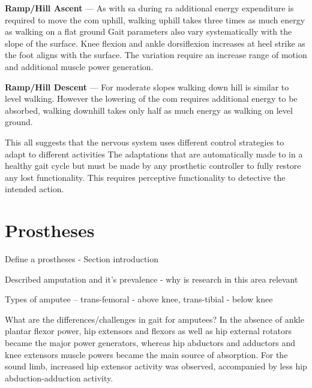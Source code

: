 \textbf{Ramp/Hill Ascent} --- As with \acrshort{sa} during \acrshort{ra} additional energy expenditure is required to move the \acrshort{com} uphill\cite{Franz2012a}, walking uphill takes three times as much energy as walking on a flat ground\cite{Matsumoto2017} Gait parameters also vary systematically with the slope of the surface\cite{Kimel-Naor2017}. Knee flexion and ankle dorsiflexion increases at heel strike as the foot aligns with the surface. The variation require an increase range of motion and additional muscle power generation.\cite{McIntosh2006}

\textbf{Ramp/Hill Descent} --- For moderate slopes walking down hill is similar to level walking. However the lowering of the \acrshort{com} requires additional energy to be absorbed\cite{Franz2012a}, walking downhill takes only half as much energy as walking on level ground\cite{Matsumoto2017}.

This all suggests that the nervous system uses different control strategies to adapt to different activities\cite{Lay2007} The adaptations that are automatically made to in a healthy gait cycle but must be made by any prosthetic controller to fully restore any lost functionality. This requires perceptive functionality to detective the intended action.



\section{Prostheses}
Define a prostheses - Section introduction

Described amputation and it's prevalence - why is research in this area relevant 

Types of amputee -- trans-femoral - above knee, trans-tibial - below knee

What are the differences/challenges in gait for amputees? 
In the absence of ankle plantar flexor power, hip extensors and flexors as well as hip external rotators became the major power generators, whereas hip abductors and adductors and knee extensors muscle powers became the main source of absorption. For the sound limb, increased hip extensor activity was observed, accompanied by less hip abduction-adduction activity.\cite{Sadeghi2001}

